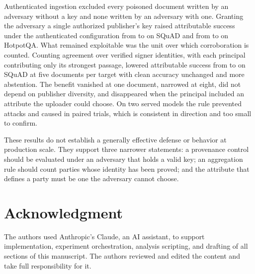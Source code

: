 \documentclass[lettersize,journal]{IEEEtran}
\begin{document}
Authenticated ingestion excluded every poisoned document written by an adversary without a key
and none written by an adversary with one. Granting the adversary a single authorized
publisher's key raised attributable success under the authenticated configuration from
\casrAdaptiveSquadfullsigned{} to \compromiseSignedSquadBThree{} on SQuAD and from
\casrAdaptiveHotpotqafullsigned{} to \compromiseSignedHotpotqaBThree{} on HotpotQA. What
remained exploitable was the unit over which corroboration is counted. Counting agreement over
verified signer identities, with each principal contributing only its strongest passage,
lowered attributable success from \compromiseSignedSquadBFive{} to
\compromiseSignedIndependentSquadBFive{} on SQuAD at five documents per target with clean
accuracy unchanged and more abstention. The benefit vanished at one document, narrowed at
eight, did not depend on publisher diversity, and disappeared when the principal included an
attribute the uploader could choose. On two served models the rule prevented
\pairedIndepPooledPrevented{} attacks and caused \pairedIndepPooledCaused{} in
\pairedIndepPooledPairs{} paired trials, which is consistent in direction and too small to
confirm.

These results do not establish a generally effective defense or behavior at production scale.
They support three narrower statements: a provenance control should be evaluated under an
adversary that holds a valid key; an aggregation rule should count parties whose identity has
been proved; and the attribute that defines a party must be one the adversary cannot choose.

\section*{Acknowledgment}

The authors used Anthropic's Claude, an AI assistant, to support implementation, experiment
orchestration, analysis scripting, and drafting of all sections of this manuscript. The
authors reviewed and edited the content and take full responsibility for it.



\end{document}
